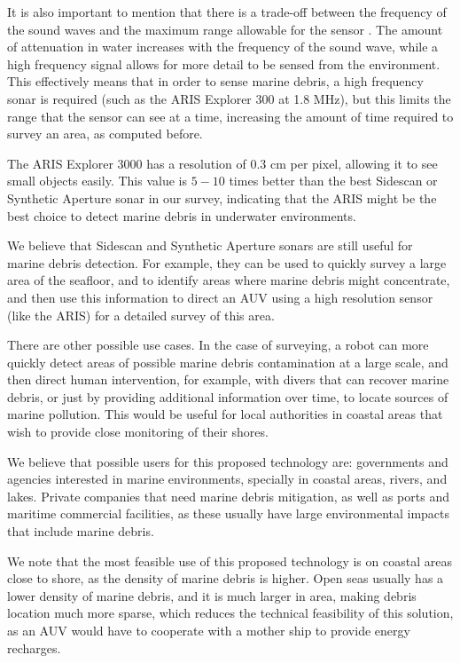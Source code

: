 It is also important to mention that there is a trade-off between the frequency of the sound waves and the maximum range allowable for the sensor \cite[5em]{hansen2009introduction}. The amount of attenuation in water increases with the frequency of the sound wave, while a high frequency signal allows for more detail to be sensed from the environment. This effectively means that in order to sense marine debris, a high frequency sonar is required (such as the ARIS Explorer 300 at 1.8 MHz), but this limits the range that the sensor can see at a time, increasing the amount of time required to survey an area, as computed before.

The ARIS Explorer 3000 has a resolution of 0.3 cm per pixel, allowing it to see small objects easily. This value is $5-10$ times better than the best Sidescan or Synthetic Aperture sonar in our survey, indicating that the ARIS might be the best choice to detect marine debris in underwater environments.

We believe that Sidescan and Synthetic Aperture sonars are still useful for marine debris detection. For example, they can be used to quickly survey a large area of the seafloor, and to identify areas where marine debris might concentrate, and then use this information to direct an AUV using a high resolution sensor (like the ARIS) for a detailed survey of this area.

There are other possible use cases. In the case of surveying, a robot can more quickly detect areas of possible marine debris contamination at a large scale, and then direct human intervention, for example, with divers that can recover marine debris, or just by providing additional information over time, to locate sources of marine pollution. This would be useful for local authorities in coastal areas that wish to provide close monitoring of their shores.

We believe that possible users for this proposed technology are: governments and agencies interested in marine environments, specially in coastal areas, rivers, and lakes. Private companies that need marine debris mitigation, as well as ports and maritime commercial facilities, as these usually have large environmental impacts that include marine debris.

We note that the most feasible use of this proposed technology is on coastal areas close to shore, as the density of marine debris is higher. Open seas usually has a lower density of marine debris, and it is much larger in area, making debris location much more sparse, which reduces the technical feasibility of this solution, as an AUV would have to cooperate with a mother ship to provide energy recharges.

